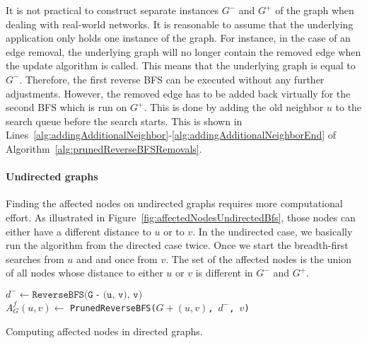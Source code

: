 It is not practical to construct separate instances $G^-$ and $G^{+}$ of the graph when dealing with real-world networks. It is reasonable to assume that the underlying application only holds one instance of the graph. For instance, in the case of an edge removal, the underlying graph will no longer contain the removed edge when the update algorithm is called. This means that the underlying graph is equal to $G^-$. Therefore, the first reverse BFS can be executed without any further adjustments. However, the removed edge has to be added back virtually for the second BFS which is run on $G^{+}$. This is done by adding the old neighbor $u$ to the search queue before the search starts. This is shown in Lines~\ref{alg:addingAdditionalNeighbor}-\ref{alg:addingAdditionalNeighborEnd} of Algorithm~\ref{alg:prunedReverseBFSRemovals}.

\paragraph{Undirected graphs}
Finding the affected nodes on undirected graphs requires more computational effort. As illustrated in Figure~\ref{fig:affectedNodesUndirectedBfs}, those nodes can either have a different distance to $u$ or to $v$. In the undirected case, we basically run the algorithm from the directed case twice. Once we start the breadth-first searches from $u$ and and once from $v$. The set of the affected nodes is the union of all nodes whose distance to either $u$ or $v$ is different in $G^-$ and $G^{+}$.

\begin{algorithm2e}[h!]
 \label{alg:affectedNodesDirected}
   
   $d^- \gets \texttt{ReverseBFS(G - (u, v), v)}$ \label{alg:reverseBFSCall} \\
   
   $A_G^f(u, v) \gets$ \texttt{PrunedReverseBFS($G + (u, v)$, $d^-$, $v$)}
   
 \caption{Computing affected nodes in directed graphs.}
\end{algorithm2e}



